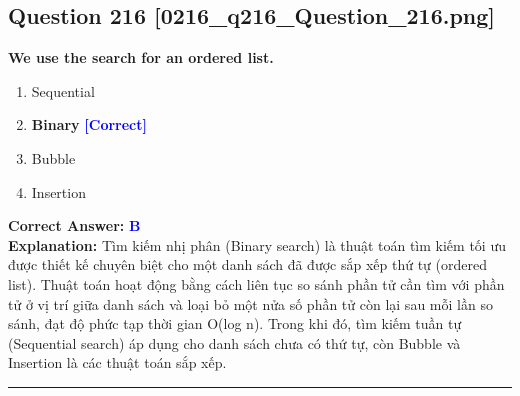 \documentclass[11pt,a4paper]{article}
\begin{document}
\begin{minipage}{\textwidth}
\subsection*{Question 216 \quad \footnotesize{[0216\_q216\_Question\_216.png]}}
\noindent \textbf{We use the search for an ordered list.}

\begin{enumerate}[label=\Alph*.]
    \item Sequential
    \item \textbf{Binary} \hfill \textcolor{blue}{\textbf{[Correct]}}
    \item Bubble
    \item Insertion
\end{enumerate}

\noindent \textbf{Correct Answer:} \textcolor{blue}{\textbf{B}} \\[2pt]
\noindent \textbf{Explanation:} Tìm kiếm nhị phân (Binary search) là thuật toán tìm kiếm tối ưu được thiết kế chuyên biệt cho một danh sách đã được sắp xếp thứ tự (ordered list). Thuật toán hoạt động bằng cách liên tục so sánh phần tử cần tìm với phần tử ở vị trí giữa danh sách và loại bỏ một nửa số phần tử còn lại sau mỗi lần so sánh, đạt độ phức tạp thời gian O(log n). Trong khi đó, tìm kiếm tuần tự (Sequential search) áp dụng cho danh sách chưa có thứ tự, còn Bubble và Insertion là các thuật toán sắp xếp.

\par\vspace{0.3cm}
\hrule
\vspace{0.3cm}
\end{minipage}
\end{document}
